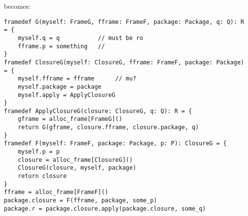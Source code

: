 \documentclass[letterpaper,11pt]{article}
\newcommand{\code}[1]{\lstinline$#1$}
\begin{document}
becomes:

\begin{lstlisting}
framedef G(myself: FrameG, fframe: FrameF, package: Package, q: Q): R = {
	myself.q = q           // must be ro
	fframe.p = something   //
}
framedef ClosureG(myself: ClosureG, fframe: FrameF, package: Package) = {
	myself.fframe = fframe      // mu?
	myself.package = package
	myself.apply = ApplyClosureG
}
framedef ApplyClosureG(closure: ClosureG, q: Q): R = {
	gframe = alloc_frame[FrameG]()
	return G(gframe, closure.fframe, closure.package, q)
}
framedef F(myself: FrameF, package: Package, p: P): ClosureG = {
	myself.p = p
	closure = alloc_frame[ClosureG]()
	ClosureG(closure, myself, package)
	return closure
}
fframe = alloc_frame[FrameF]()
package.closure = F(fframe, package, some_p)
package.r = package.closure.apply(package.closure, some_q)
\end{lstlisting}


\begin{comment}
An example of a pure constructor that calls the closure returned by~\code{F}:

\begin{lstlisting}
class D {
	val some_p = new P
	val callsG = F(some_p)
	val r = callsG(some_q)      // modifies some_p
}
\end{lstlisting}

becomes:

\begin{lstlisting}
framedef D(myself: D, package: Package): D = {
	myself.some_p = P(alloc_frame[FrameP](), ...)
	myself.callsG = F(alloc_frame[FrameF](), package, myself.some_p)
	myself.r = callsG(some_q)   // modifies some_p
	return myself
}
\end{lstlisting}

The above example may look pathological, but at the present time,
I have no reason to think that something like it is unusual.
\end{comment}

%
%
%
%
\end{document}
